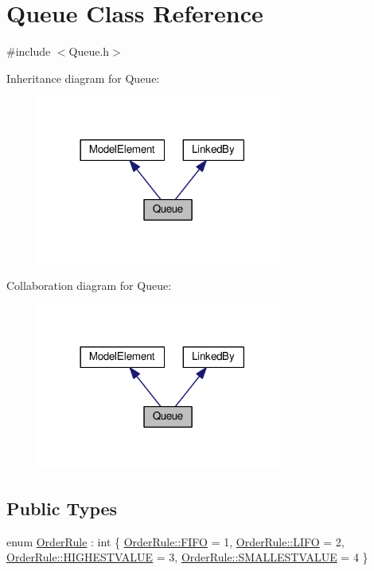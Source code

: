 \hypertarget{class_queue}{}\section{Queue Class Reference}
\label{class_queue}


{\ttfamily \#include $<$Queue.\+h$>$}



Inheritance diagram for Queue\+:\nopagebreak
\begin{figure}[H]
\begin{center}
\leavevmode
\includegraphics[width=234pt]{class_queue__inherit__graph}
\end{center}
\end{figure}


Collaboration diagram for Queue\+:\nopagebreak
\begin{figure}[H]
\begin{center}
\leavevmode
\includegraphics[width=234pt]{class_queue__coll__graph}
\end{center}
\end{figure}
\subsection*{Public Types}
\begin{DoxyCompactItemize}
\item 
enum \hyperlink{class_queue_ad95b032373998be7300d630784246aae}{Order\+Rule} \+: int \{ \hyperlink{class_queue_ad95b032373998be7300d630784246aaeac589858dbe1d06c46544266ae4cd2c6f}{Order\+Rule\+::\+F\+I\+FO} = 1, 
\hyperlink{class_queue_ad95b032373998be7300d630784246aaea249e6270d397378907bb92948fb14876}{Order\+Rule\+::\+L\+I\+FO} = 2, 
\hyperlink{class_queue_ad95b032373998be7300d630784246aaeac4484b1c747b2daf46405fd02cb106fd}{Order\+Rule\+::\+H\+I\+G\+H\+E\+S\+T\+V\+A\+L\+UE} = 3, 
\hyperlink{class_queue_ad95b032373998be7300d630784246aaea40dc8d31da54b6a213022f8c6165440e}{Order\+Rule\+::\+S\+M\+A\+L\+L\+E\+S\+T\+V\+A\+L\+UE} = 4
 \}
\end{DoxyCompactItemize}
